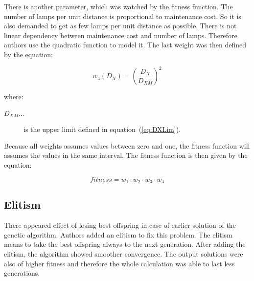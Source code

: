 There is another parameter, which was watched by the fitness function. The number of lamps per unit distance is proportional to maintenance cost. So it is also demanded to get as few lamps per unit distance as possible. There is not linear dependency between maintenance cost and number of lamps. Therefore authors use the quadratic function to model it. The last weight was then defined by the equation:

\begin{equation}
w_4\left(D_X\right)= \left(\frac{D_{X}}{D_{XM}}\right)^2
\label{eq:w4}
\end{equation}

where:
\begin{description}
\item [$D_{XM}$...] is the upper limit defined in equation~(\ref{eq:DXLim}).
\end{description}

Because all weights assumes values between zero and one, the fitness function will assumes the values in the same interval. The fitness function is then given by the equation:

\begin{equation}
\textit{fitness}= w_1 \cdot w_2 \cdot w_3 \cdot w_4
\label{eq:fitness}
\end{equation}

\subsection{Elitism}
There appeared effect of losing best offspring in case of earlier solution of the genetic algorithm. Authors added an elitism to fix this problem. The elitism means to take the best offspring always to the next generation. After adding the elitism, the algorithm showed smoother convergence. The output solutions were also of higher fitness and therefore the whole calculation was able to last less generations.